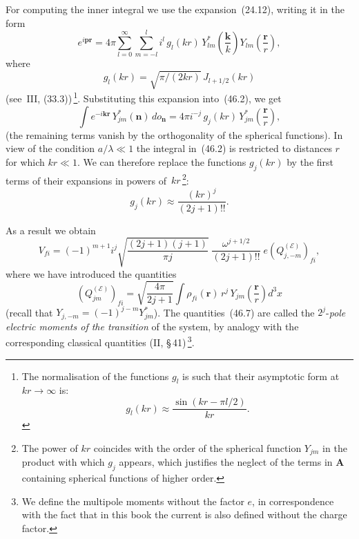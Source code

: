 For computing the inner integral we use the expansion~(24.12), writing it in the form
\begin{equation}
e^{i\mathbf{p}\mathbf{r}} = 4\pi\sum_{l=0}^{\infty}\sum_{m=-l}^{l}i^l\,g_l(kr)\,Y^*_{lm}\!\left(\frac{\mathbf{k}}{k}\right)Y_{lm}\!\left(\frac{\mathbf{r}}{r}\right),
\tag{46.3}
\end{equation}
where
\begin{equation}
g_l(kr) = \sqrt{\pi/(2kr)}\,J_{l+1/2}(kr)
\tag{46.4}
\end{equation}
(see~III, (33.3))\,\footnote{The normalisation of the functions $g_l$ is such that their asymptotic form at $kr\to\infty$ is:
\begin{equation}
g_l(kr) \approx \frac{\sin(kr - \pi l/2)}{kr}.
\tag{46.4a}
\end{equation}}. Substituting this expansion into~(46.2), we get
\[
\int e^{-i\mathbf{k}\mathbf{r}}\,Y^*_{jm}(\mathbf{n})\,do_\mathbf{n} = 4\pi i^{-j}\,g_j(kr)\,Y^*_{jm}\!\left(\frac{\mathbf{r}}{r}\right),
\]
(the remaining terms vanish by the orthogonality of the spherical functions). In view of the condition $a/\lambda \ll 1$ the integral in~(46.2) is restricted to distances $r$ for which $kr \ll 1$. We can therefore replace the functions $g_j(kr)$ by the first terms of their expansions in powers of~$kr$\,\footnote{The power of $kr$ coincides with the order of the spherical function $Y_{jm}$ in the product with which $g_j$ appears, which justifies the neglect of the terms in $\mathbf{A}$ containing spherical functions of higher order.}:
\begin{equation}
g_j(kr) \approx \frac{(kr)^j}{(2j+1)!!}.
\tag{46.5}
\end{equation}

As a result we obtain
\begin{equation}
V_{fi} = (-1)^{m+1}i^j\sqrt{\frac{(2j+1)(j+1)}{\pi j}}\;\frac{\omega^{j+1/2}}{(2j+1)!!}\;e(Q^{(\mathscr{E})}_{j,-m})_{fi},
\tag{46.6}
\end{equation}
where we have introduced the quantities
\begin{equation}
(Q^{(\mathscr{E})}_{jm})_{fi} = \sqrt{\frac{4\pi}{2j+1}}\int\rho_{fi}(\mathbf{r})\,r^j\,Y_{jm}\!\left(\frac{\mathbf{r}}{r}\right)d^3x
\tag{46.7}
\end{equation}
(recall that $Y_{j,-m} = (-1)^{j-m}Y^*_{jm}$). The quantities~(46.7) are called the $2^j$-\textit{pole electric moments of the transition} of the system, by analogy with the corresponding classical quantities (II, \S\,41)\,\footnote{We define the multipole moments without the factor $e$, in correspondence with the fact that in this book the current is also defined without the charge factor.}.

